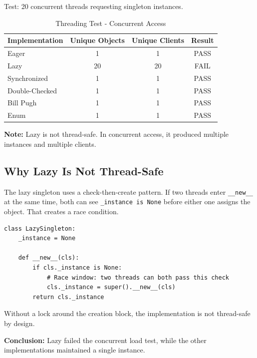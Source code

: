 \documentclass[12pt,a4paper]{article}
\begin{document}
Test: 20 concurrent threads requesting singleton instances.

\begin{table}[H]
\centering
\caption{Threading Test - Concurrent Access}
\label{tab:threading}
\begin{tabular}{|l|c|c|c|}
\hline
\textbf{Implementation} & \textbf{Unique Objects} & \textbf{Unique Clients} & \textbf{Result} \\
\hline\hline
Eager & 1 & 1 & \cellcolor{passgreen}PASS \\
Lazy & 20 & 20 & \cellcolor{failred}FAIL \\
Synchronized & 1 & 1 & \cellcolor{passgreen}PASS \\
Double-Checked & 1 & 1 & \cellcolor{passgreen}PASS \\
Bill Pugh & 1 & 1 & \cellcolor{passgreen}PASS \\
Enum & 1 & 1 & \cellcolor{passgreen}PASS \\
\hline
\end{tabular}
\end{table}

\textbf{Note:} Lazy is not thread-safe. In concurrent access, it produced multiple instances and multiple clients.

\subsection{Why Lazy Is Not Thread-Safe}

The lazy singleton uses a check-then-create pattern. If two threads enter \texttt{\_\_new\_\_} at the same time, both can see \texttt{\_instance is None} before either one assigns the object. That creates a race condition.

\begin{verbatim}
class LazySingleton:
    _instance = None

    def __new__(cls):
        if cls._instance is None:
            # Race window: two threads can both pass this check
            cls._instance = super().__new__(cls)
        return cls._instance
\end{verbatim}

Without a lock around the creation block, the implementation is not thread-safe by design.

\textbf{Conclusion:} Lazy failed the concurrent load test, while the other implementations maintained a single instance.

\end{document}
